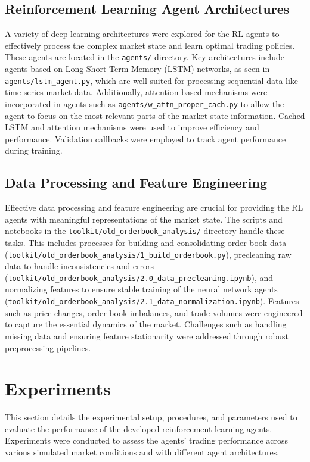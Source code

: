 \documentclass{IEEEtran}
\begin{document}
\subsection{Reinforcement Learning Agent Architectures}
A variety of deep learning architectures were explored for the RL agents to effectively process the complex market state and learn optimal trading policies. These agents are located in the \texttt{agents/} directory. Key architectures include agents based on Long Short-Term Memory (LSTM) networks, as seen in \texttt{agents/lstm\_agent.py}, which are well-suited for processing sequential data like time series market data. Additionally, attention-based mechanisms were incorporated in agents such as \texttt{agents/w\_attn\_proper\_cach.py} to allow the agent to focus on the most relevant parts of the market state information. Cached LSTM and attention mechanisms were used to improve efficiency and performance. Validation callbacks were employed to track agent performance during training.

\subsection{Data Processing and Feature Engineering}
Effective data processing and feature engineering are crucial for providing the RL agents with meaningful representations of the market state. The scripts and notebooks in the \texttt{toolkit/old\_orderbook\_analysis/} directory handle these tasks. This includes processes for building and consolidating order book data (\texttt{toolkit/old\_orderbook\_analysis/1\_build\_orderbook.py}), precleaning raw data to handle inconsistencies and errors (\texttt{toolkit/old\_orderbook\_analysis/2.0\_data\_precleaning.ipynb}), and normalizing features to ensure stable training of the neural network agents (\texttt{toolkit/old\_orderbook\_analysis/2.1\_data\_normalization.ipynb}). Features such as price changes, order book imbalances, and trade volumes were engineered to capture the essential dynamics of the market. Challenges such as handling missing data and ensuring feature stationarity were addressed through robust preprocessing pipelines.

\section{Experiments}
This section details the experimental setup, procedures, and parameters used to evaluate the performance of the developed reinforcement learning agents. Experiments were conducted to assess the agents' trading performance across various simulated market conditions and with different agent architectures.
\end{document}
